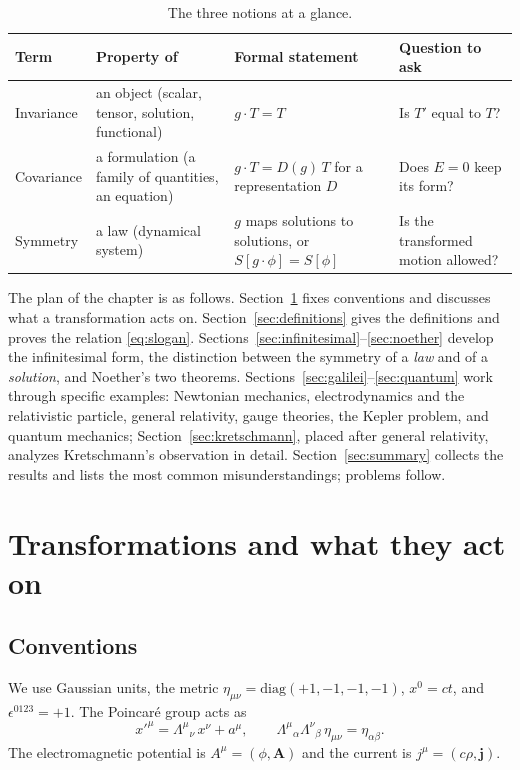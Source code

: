\documentclass[11pt,a4paper,openany]{book}
\theoremstyle{definition}
\theoremstyle{plain}
\theoremstyle{remark}
\newcommand{\vA}{\bm{A}}
\begin{document}
\begin{table}[ht]
\centering
\small
\renewcommand{\arraystretch}{1.3}
\setlength{\tabcolsep}{4pt}
\begin{tabular}{@{}p{2.1cm}p{3.9cm}p{4.6cm}p{4.0cm}@{}}
\toprule
Term & Property of & Formal statement & Question to ask\\
\midrule
Invariance & an object (scalar, tensor, solution, functional)
  & $g\cdot T = T$ & Is $T'$ equal to $T$?\\
Covariance & a formulation (a family of quantities, an equation)
  & $g\cdot T = D(g)\,T$ for a representation $D$
  & Does $E=0$ keep its form?\\
Symmetry & a law (dynamical system)
  & $g$ maps solutions to solutions, or $S[g\cdot\phi]=S[\phi]$
  & Is the transformed motion allowed?\\
\bottomrule
\end{tabular}
\caption{The three notions at a glance.}
\label{tab:dictionary}
\end{table}

The plan of the chapter is as follows. Section~\ref{sec:transformations}
fixes conventions and discusses what a transformation acts on.
Section~\ref{sec:definitions} gives the definitions and proves the relation
\eqref{eq:slogan}. Sections~\ref{sec:infinitesimal}--\ref{sec:noether}
develop the infinitesimal form, the distinction between the symmetry of a
\emph{law} and of a \emph{solution}, and Noether's two theorems.
Sections~\ref{sec:galilei}--\ref{sec:quantum} work through specific examples:
Newtonian mechanics, electrodynamics and the relativistic particle, general
relativity, gauge theories, the Kepler problem, and quantum mechanics;
Section~\ref{sec:kretschmann}, placed after general relativity, analyzes
Kretschmann's observation in detail.
Section~\ref{sec:summary} collects the results and lists the most common
misunderstandings; problems follow.

\section{Transformations and what they act on}
\label{sec:transformations}

\subsection{Conventions}

We use Gaussian units, the metric $\eta_{\mu\nu}=\mathrm{diag}(+1,-1,-1,-1)$,
$x^0=ct$, and $\epsilon^{0123}=+1$. The Poincar\'e group acts as
\begin{equation}\label{eq:poincare}
  x'^\mu = \Lambda^\mu{}_{\nu}\,x^\nu + a^\mu,\qquad
  \Lambda^\mu{}_{\alpha}\Lambda^\nu{}_{\beta}\,\eta_{\mu\nu}=\eta_{\alpha\beta}.
\end{equation}
The electromagnetic potential is $A^\mu=(\phi,\vA)$ and the current is
$j^\mu=(c\rho,\bm j)$.
\end{document}
